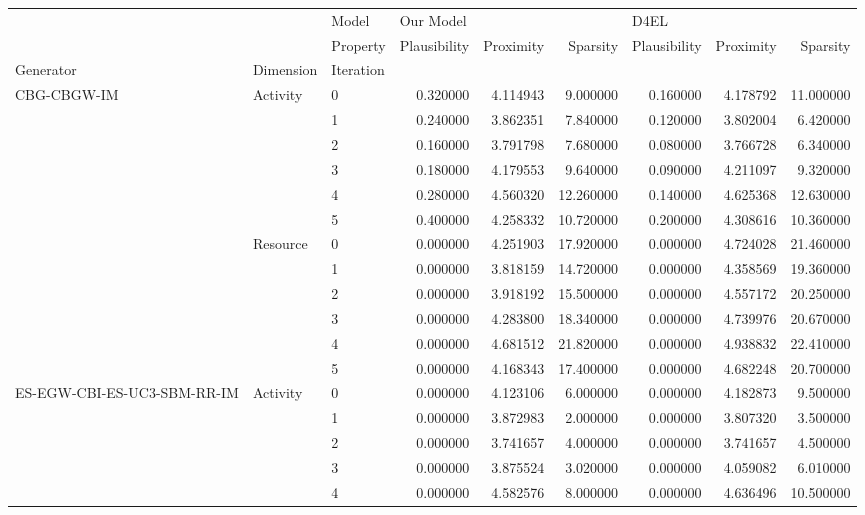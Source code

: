 \begin{tabular}{lllrrrrrr}
\toprule
 &  & Model & \multicolumn{3}{l}{Our Model} & \multicolumn{3}{l}{D4EL} \\
 &  & Property & Plausibility & Proximity & Sparsity & Plausibility & Proximity & Sparsity \\
Generator & Dimension & Iteration &  &  &  &  &  &  \\
\midrule
\multirow[c]{12}{*}{CBG-CBGW-IM} & \multirow[c]{6}{*}{Activity} & 0 & 0.320000 & 4.114943 & 9.000000 & 0.160000 & 4.178792 & 11.000000 \\
 &  & 1 & 0.240000 & 3.862351 & 7.840000 & 0.120000 & 3.802004 & 6.420000 \\
 &  & 2 & 0.160000 & 3.791798 & 7.680000 & 0.080000 & 3.766728 & 6.340000 \\
 &  & 3 & 0.180000 & 4.179553 & 9.640000 & 0.090000 & 4.211097 & 9.320000 \\
 &  & 4 & 0.280000 & 4.560320 & 12.260000 & 0.140000 & 4.625368 & 12.630000 \\
 &  & 5 & 0.400000 & 4.258332 & 10.720000 & 0.200000 & 4.308616 & 10.360000 \\
\cline{2-3}
 & \multirow[c]{6}{*}{Resource} & 0 & 0.000000 & 4.251903 & 17.920000 & 0.000000 & 4.724028 & 21.460000 \\
 &  & 1 & 0.000000 & 3.818159 & 14.720000 & 0.000000 & 4.358569 & 19.360000 \\
 &  & 2 & 0.000000 & 3.918192 & 15.500000 & 0.000000 & 4.557172 & 20.250000 \\
 &  & 3 & 0.000000 & 4.283800 & 18.340000 & 0.000000 & 4.739976 & 20.670000 \\
 &  & 4 & 0.000000 & 4.681512 & 21.820000 & 0.000000 & 4.938832 & 22.410000 \\
 &  & 5 & 0.000000 & 4.168343 & 17.400000 & 0.000000 & 4.682248 & 20.700000 \\
\cline{1-3} \cline{2-3}
\multirow[c]{12}{*}{ES-EGW-CBI-ES-UC3-SBM-RR-IM} & \multirow[c]{6}{*}{Activity} & 0 & 0.000000 & 4.123106 & 6.000000 & 0.000000 & 4.182873 & 9.500000 \\
 &  & 1 & 0.000000 & 3.872983 & 2.000000 & 0.000000 & 3.807320 & 3.500000 \\
 &  & 2 & 0.000000 & 3.741657 & 4.000000 & 0.000000 & 3.741657 & 4.500000 \\
 &  & 3 & 0.000000 & 3.875524 & 3.020000 & 0.000000 & 4.059082 & 6.010000 \\
 &  & 4 & 0.000000 & 4.582576 & 8.000000 & 0.000000 & 4.636496 & 10.500000 \\

\end{tabular}

